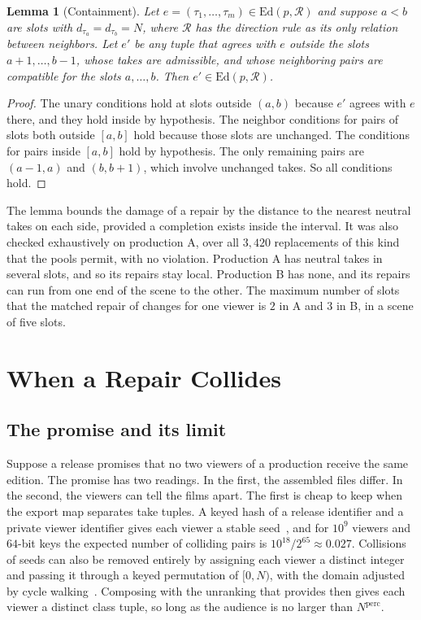 \documentclass[11pt,twoside,openright]{book}
\theoremstyle{plain}
\newtheorem{lemma}[theorem]{Lemma}
\theoremstyle{definition}
\theoremstyle{remark}
\newcommand{\Ed}{\mathrm{Ed}}       %
\begin{document}
\begin{lemma}[Containment]\label{lem:contain}
Let $e=(\tau_1,\dots,\tau_m)\in\Ed(p,\mathcal R)$ and suppose $a<b$ are slots with $d_{\tau_a}=d_{\tau_b}=N$, where $\mathcal R$ has the direction rule as its only relation between neighbors. Let $e'$ be any tuple that agrees with $e$ outside the slots $a+1,\dots,b-1$, whose takes are admissible, and whose neighboring pairs are compatible for the slots $a,\dots,b$. Then $e'\in\Ed(p,\mathcal R)$.
\end{lemma}

\begin{proof}
The unary conditions hold at slots outside $(a,b)$ because $e'$ agrees with $e$ there, and they hold inside by hypothesis. The neighbor conditions for pairs of slots both outside $[a,b]$ hold because those slots are unchanged. The conditions for pairs inside $[a,b]$ hold by hypothesis. The only remaining pairs are $(a-1,a)$ and $(b,b+1)$, which involve unchanged takes. So all conditions hold.
\end{proof}

The lemma bounds the damage of a repair by the distance to the nearest neutral takes on each side, provided a completion exists inside the interval. It was also checked exhaustively on production A, over all $3{,}420$ replacements of this kind that the pools permit, with no violation. Production A has neutral takes in several slots, and so its repairs stay local. Production B has none, and its repairs can run from one end of the scene to the other. The maximum number of slots that the matched repair of  changes for one viewer is $2$ in A and $3$ in B, in a scene of five slots.

\section{When a Repair Collides}\label{sec:allocation}

\subsection{The promise and its limit}

Suppose a release promises that no two viewers of a production receive the same edition. The promise has two readings. In the first, the assembled files differ. In the second, the viewers can tell the films apart. The first is cheap to keep when the export map separates take tuples. A keyed hash of a release identifier and a private viewer identifier gives each viewer a stable seed~\cite{rfc2104}, and for $10^9$ viewers and $64$-bit keys the expected number of colliding pairs is $10^{18}/2^{65}\approx0.027$. Collisions of seeds can also be removed entirely by assigning each viewer a distinct integer and passing it through a keyed permutation of $[0,N)$, with the domain adjusted by cycle walking~\cite{blackrogaway2002}. Composing with the unranking that  provides then gives each viewer a distinct class tuple, so long as the audience is no larger than $N^{\mathrm{perc}}$.
\end{document}
